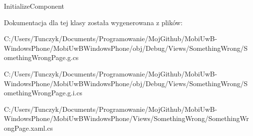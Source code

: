 Initialize\+Component 



Dokumentacja dla tej klasy została wygenerowana z plików\+:\begin{DoxyCompactItemize}
\item 
C\+:/\+Users/\+Tunczyk/\+Documents/\+Programowanie/\+Moj\+Github/\+Mobi\+Uw\+B-\/\+Windows\+Phone/\+Mobi\+Uw\+B\+Windows\+Phone/obj/\+Debug/\+Views/\+Something\+Wrong/Something\+Wrong\+Page.\+g.\+cs\item 
C\+:/\+Users/\+Tunczyk/\+Documents/\+Programowanie/\+Moj\+Github/\+Mobi\+Uw\+B-\/\+Windows\+Phone/\+Mobi\+Uw\+B\+Windows\+Phone/obj/\+Debug/\+Views/\+Something\+Wrong/Something\+Wrong\+Page.\+g.\+i.\+cs\item 
C\+:/\+Users/\+Tunczyk/\+Documents/\+Programowanie/\+Moj\+Github/\+Mobi\+Uw\+B-\/\+Windows\+Phone/\+Mobi\+Uw\+B\+Windows\+Phone/\+Views/\+Something\+Wrong/Something\+Wrong\+Page.\+xaml.\+cs\end{DoxyCompactItemize}
